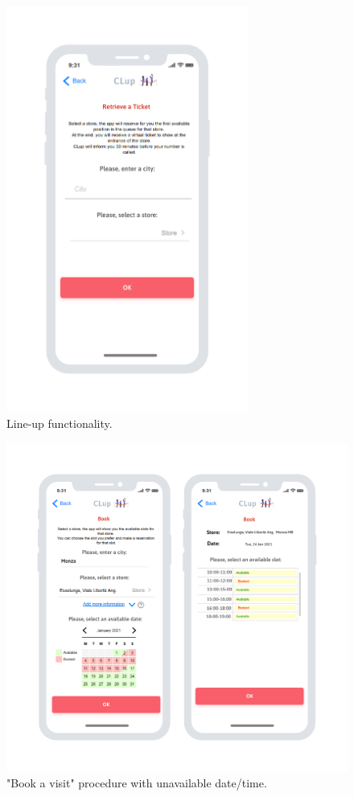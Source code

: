 \documentclass[table, 12pt]{article}
\begin{document}
\begin{figure}[H]
    \begin{center}
        \includegraphics[width=225pt]{assets/Mockups/new_mock/retrieve_a_ticket.png}
        \caption{Line-up functionality.}
        \label{mock_new_booking}
    \end{center}
\end{figure}

\begin{figure}[H]
    \begin{center}
        \includegraphics[width=400pt]{assets/Mockups/new_mock/book.png}
        \caption{"Book a visit" procedure with unavailable date/time.}
        \label{mock_book_a_visit}
    \end{center}
\end{figure}
\end{document}
